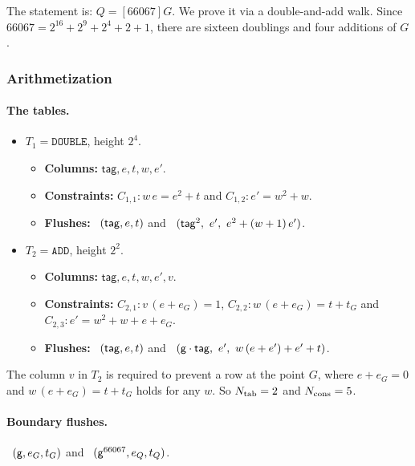 The statement is: $Q=[66067]G$. We prove it via a double-and-add walk. Since $66067=2^{16}+2^{9}+2^{4}+2+1$, there are sixteen doublings and four additions of $G$.

\subsubsection{Arithmetization}

\paragraph{The tables.}

\begin{itemize}[itemsep=3pt,topsep=3pt]
\item $T_1=\texttt{DOUBLE}$, height $2^{4}$.
  \begin{itemize}[itemsep=1pt,topsep=1pt,label={}]
  \item \textbf{Columns:} $\mathsf{tag},e,t,w,e'$.
  \item \textbf{Constraints:} $C_{1,1}: w\,e=e^{2}+t$ and $C_{1,2}: e'=w^{2}+w$.
  \item \textbf{Flushes:} \pull\ $( \mathsf{tag},e,t )$ and \push\ $\tup{\mathsf{tag}^{2},\ e',\ e^{2}+(w+1)\,e'}$.
  \end{itemize}
\item $T_2=\texttt{ADD}$, height $2^{2}$.
  \begin{itemize}[itemsep=1pt,topsep=1pt,label={}]
  \item \textbf{Columns:} $\mathsf{tag},e,t,w,e',v$.
  \item \textbf{Constraints:} $C_{2,1}: v\,(e+e_G)=1$, $C_{2,2}: w\,(e+e_G)=t+t_G$ and $C_{2,3}: e'=w^{2}+w+e+e_G$.
  \item \textbf{Flushes:} \pull\ $( \mathsf{tag},e,t )$ and \push\ $\tup{\gen\cdot\mathsf{tag},\ e',\ w\,(e+e')+e'+t}$.
  \end{itemize}
\end{itemize}
The column $v$ in $T_2$ is required to prevent a row at the point $G$, where $e+e_G=0$ and $w\,(e+e_G)=t+t_G$ holds for any $w$. So $N_{\mathrm{tab}}=2$ and $N_{\mathrm{cons}}=5$.

\paragraph{Boundary flushes.} \push\ $( \mathsf{g},e_G,t_G )$ and \pull\ $( \mathsf{g}^{66067},e_Q,t_Q )$.

\vspace{5mm}

